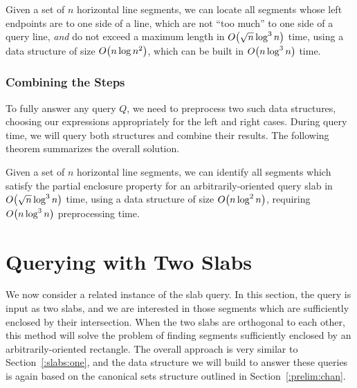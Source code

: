 \begin{lemma}
\label{lem:slabs:one:step3}
Given a set of $n$ horizontal line segments, we can locate all segments whose left endpoints are to one side of a line, which are not ``too much'' to one side of a query line, \emph{and} do not exceed a maximum length in $O\!\left(\sqrt{n}\log^3{n}\right)$ time, using a data structure of size $O\!\left(n\log{n}^2\right)$, which can be built in $O\!\left(n\log^3{n}\right)$ time.
\end{lemma}

\subsubsection{Combining the Steps}

To fully answer any query $Q$, we need to preprocess two such data structures, choosing our expressions appropriately for the left and right cases.
During query time, we will query both structures and combine their results.
The following theorem summarizes the overall solution.

\begin{theorem}
\label{th:slabs:one}
Given a set of $n$ horizontal line segments, we can identify all segments which satisfy the partial enclosure property for an arbitrarily-oriented query slab in $O\!\left(\sqrt{n}\log^3{n}\right)$ time, using a data structure of size $O\!\left(n\log^2{n}\right)$, requiring $O\!\left(n\log^3{n}\right)$ preprocessing time.
\end{theorem}


\section{Querying with Two Slabs}
\label{:slabs:two}

We now consider a related instance of the slab query. 
In this section, the query is input as two slabs, and we are interested in those segments which are sufficiently enclosed by their intersection. 
When the two slabs are orthogonal to each other, this method will solve the problem of finding segments sufficiently enclosed by an arbitrarily-oriented rectangle.  
The overall approach is very similar to Section~\ref{:slabs:one}, and the data structure we will build to answer these queries is again based on the canonical sets structure outlined in Section~\ref{:prelim:chan}.


